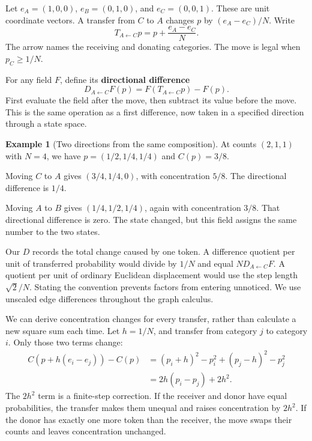 \documentclass[11pt,oneside,openany]{book}
\theoremstyle{definition}
\newtheorem{example}{Example}[chapter]
\theoremstyle{remark}
\numberwithin{equation}{chapter}
\begin{document}
Let \(e_A=(1,0,0)\), \(e_B=(0,1,0)\), and \(e_C=(0,0,1)\). These are unit coordinate vectors. A transfer from \(C\) to \(A\) changes \(p\) by \((e_A-e_C)/N\). Write \[T_{A\leftarrow C}p=p+\frac{e_A-e_C}{N}.\] The arrow names the receiving and donating categories. The move is legal when \(p_C\geq1/N\).

For any field \(F\), define its \textbf{directional difference} \[\boxed{D_{A\leftarrow C}F(p)=F(T_{A\leftarrow C}p)-F(p).}\] First evaluate the field after the move, then subtract its value before the move. This is the same operation as a first difference, now taken in a specified direction through a state space.

\begin{example}[Two directions from the same composition]

At counts \((2,1,1)\) with \(N=4\), we have \(p=(1/2,1/4,1/4)\) and \(C(p)=3/8\).

Moving \(C\) to \(A\) gives \((3/4,1/4,0)\), with concentration \(5/8\). The directional difference is \(1/4\).

Moving \(A\) to \(B\) gives \((1/4,1/2,1/4)\), again with concentration \(3/8\). That directional difference is zero. The state changed, but this field assigns the same number to the two states.

\end{example}

Our \(D\) records the total change caused by one token. A difference quotient per unit of transferred probability would divide by \(1/N\) and equal \(ND_{A\leftarrow C}F\). A quotient per unit of ordinary Euclidean displacement would use the step length \(\sqrt2/N\). Stating the convention prevents factors from entering unnoticed. We use unscaled edge differences throughout the graph calculus.

We can derive concentration changes for every transfer, rather than calculate a new square sum each time. Let \(h=1/N\), and transfer from category \(j\) to category \(i\). Only those two terms change: \[\begin{aligned}
C(p+h(e_i-e_j))-C(p)
&=(p_i+h)^2-p_i^2+(p_j-h)^2-p_j^2\\
&=2h(p_i-p_j)+2h^2.
\end{aligned}\] The \(2h^2\) term is a finite-step correction. If the receiver and donor have equal probabilities, the transfer makes them unequal and raises concentration by \(2h^2\). If the donor has exactly one more token than the receiver, the move swaps their counts and leaves concentration unchanged.
\end{document}
